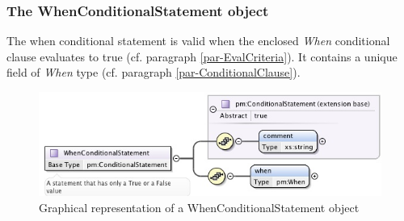 \documentclass[a4paper,11pt] {ivoa}
\begin{document}
\subsubsection{The WhenConditionalStatement object}\label{par-WhenConditionalStatment}
The when conditional statement is valid when the enclosed {\it When} conditional clause
evaluates to true (cf. paragraph \ref{par-EvalCriteria}). It contains a unique field of {\it When} type (cf. paragraph \ref{par-ConditionalClause}).
\begin{figure}[htbp]
\begin{center}
\includegraphics[width=1.0\textwidth]{pictures/WhenConditionalStatement.jpg} 
\caption{Graphical representation of a WhenConditionalStatement object}
\label{Pic-WhenConditionalStatement}
\end{center}
\end{figure}
\end{document}
